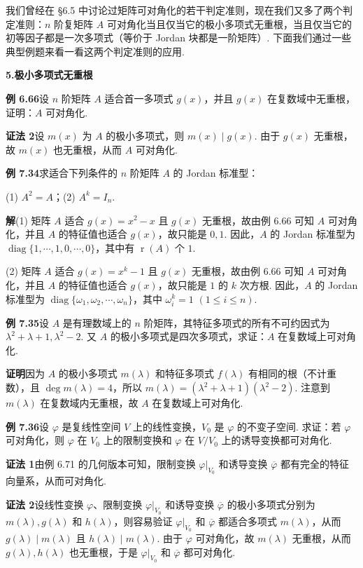 \documentclass[UTF8, 12pt, fontset=fandol, oneside]{ctexart}
\begin{document}
我们曾经在 §6.5 中讨论过矩阵可对角化的若干判定准则，现在我们又多了两个判定准则：$n$ 阶复矩阵 $A$ 可对角化当且仅当它的极小多项式无重根，当且仅当它的初等因子都是一次多项式（等价于 Jordan 块都是一阶矩阵）. 下面我们通过一些典型例题来看一看这两个判定准则的应用.

\noindent\textbf{5.\quad 极小多项式无重根}

\noindent\textbf{例 6.66}\quad 设 $n$ 阶矩阵 $A$ 适合首一多项式 $g(x)$，并且 $g(x)$ 在复数域中无重根，证明：$A$ 可对角化.

\noindent\textbf{证法 2}\quad 设 $m(x)$ 为 $A$ 的极小多项式，则 $m(x)\mid g(x)$. 由于 $g(x)$ 无重根，故 $m(x)$ 也无重根，从而 $A$ 可对角化.

\noindent\textbf{例 7.34}\quad 求适合下列条件的 $n$ 阶矩阵 $A$ 的 Jordan 标准型：

(1) $A^2=A$；\qquad (2) $A^k=I_n$.

\noindent\textbf{解}\quad (1) 矩阵 $A$ 适合 $g(x)=x^2-x$ 且 $g(x)$ 无重根，故由例 6.66 可知 $A$ 可对角化，并且 $A$ 的特征值也适合 $g(x)$，故只能是 $0,1$. 因此，$A$ 的 Jordan 标准型为 $\operatorname{diag}\{1,\cdots,1,0,\cdots,0\}$，其中有 $\operatorname{r}(A)$ 个 $1$.

(2) 矩阵 $A$ 适合 $g(x)=x^k-1$ 且 $g(x)$ 无重根，故由例 6.66 可知 $A$ 可对角化，并且 $A$ 的特征值也适合 $g(x)$，故只能是 $1$ 的 $k$ 次方根. 因此，$A$ 的 Jordan 标准型为 $\operatorname{diag}\{\omega_1,\omega_2,\cdots,\omega_n\}$，其中 $\omega_i^k=1$ $(1\le i\le n)$.

\noindent\textbf{例 7.35}\quad 设 $A$ 是有理数域上的 $n$ 阶矩阵，其特征多项式的所有不可约因式为 $\lambda^2+\lambda+1,\lambda^2-2$. 又 $A$ 的极小多项式是四次多项式，求证：$A$ 在复数域上可对角化.

\noindent\textbf{证明}\quad 因为 $A$ 的极小多项式 $m(\lambda)$ 和特征多项式 $f(\lambda)$ 有相同的根（不计重数），且 $\deg m(\lambda)=4$，所以 $m(\lambda)=(\lambda^2+\lambda+1)(\lambda^2-2)$. 注意到 $m(\lambda)$ 在复数域内无重根，故 $A$ 在复数域上可对角化.

\noindent\textbf{例 7.36}\quad 设 $\varphi$ 是复线性空间 $V$ 上的线性变换，$V_0$ 是 $\varphi$ 的不变子空间. 求证：若 $\varphi$ 可对角化，则 $\varphi$ 在 $V_0$ 上的限制变换和 $\varphi$ 在 $V/V_0$ 上的诱导变换都可对角化.

\noindent\textbf{证法 1}\quad 由例 6.71 的几何版本可知，限制变换 $\varphi|_{V_0}$ 和诱导变换 $\overline{\varphi}$ 都有完全的特征向量系，从而可对角化.

\noindent\textbf{证法 2}\quad 设线性变换 $\varphi$、限制变换 $\varphi|_{V_0}$ 和诱导变换 $\overline{\varphi}$ 的极小多项式分别为 $m(\lambda),g(\lambda)$ 和 $h(\lambda)$，则容易验证 $\varphi|_{V_0}$ 和 $\overline{\varphi}$ 都适合多项式 $m(\lambda)$，从而 $g(\lambda)\mid m(\lambda)$ 且 $h(\lambda)\mid m(\lambda)$. 由于 $\varphi$ 可对角化，故 $m(\lambda)$ 无重根，从而 $g(\lambda),h(\lambda)$ 也无重根，于是 $\varphi|_{V_0}$ 和 $\overline{\varphi}$ 都可对角化.
\end{document}
